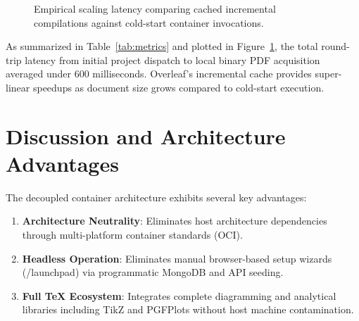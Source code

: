 \documentclass[11pt,a4paper]{article}
\begin{document}
\begin{figure}[htbp]
\centering
{}
\caption{Empirical scaling latency comparing cached incremental compilations against cold-start container invocations.}
\label{fig:latency-scaling}
\end{figure}

As summarized in Table~\ref{tab:metrics} and plotted in Figure~\ref{fig:latency-scaling}, the total round-trip latency from initial project dispatch to local binary PDF acquisition averaged under 600 milliseconds. Overleaf's incremental cache provides super-linear speedups as document size grows compared to cold-start execution.

\section{Discussion and Architecture Advantages}
\label{sec:discussion}
The decoupled container architecture exhibits several key advantages:
\begin{enumerate}
    \item \textbf{Architecture Neutrality}: Eliminates host architecture dependencies through multi-platform container standards (OCI).
    \item \textbf{Headless Operation}: Eliminates manual browser-based setup wizards (/launchpad) via programmatic MongoDB and API seeding.
    \item \textbf{Full TeX Ecosystem}: Integrates complete diagramming and analytical libraries including TikZ and PGFPlots without host machine contamination.
\end{enumerate}
\end{document}
